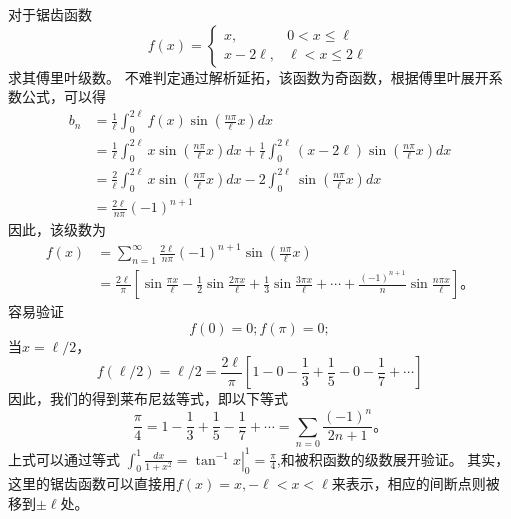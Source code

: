 \begin{examplebox}{
对于锯齿函数
\[  
f(x)= \begin{cases}
  x,   &  0 < x \leq  \ell 
  \\
  x - 2 \ell,   & \ell < x \leq 2\ell
\end{cases}
\]
求其傅里叶级数。
}
不难判定通过解析延拓，该函数为奇函数，根据傅里叶展开系数公式，可以得
\begin{align}
b_n &=   \frac{1}{\ell} \int_{0}^{2\ell} f(x) \sin {  \left( \frac{n\pi}{\ell} x \right) } dx \nonumber
\\
&= \frac{1}{\ell} \int_{0}^{2\ell} x  \sin {  \left( \frac{n\pi}{\ell} x \right) } dx \nonumber
  +
 \frac{1}{\ell} \int_{0}^{2\ell} (x - 2\ell) \sin {  \left( \frac{n\pi}{\ell} x \right) } dx \nonumber
 \\ 
 &= \frac{2}{\ell} \int_{0}^{2\ell} x \sin {  \left( \frac{n\pi}{\ell} x \right) } dx \nonumber
 -2 \int_{0}^{2\ell}   \sin {  \left( \frac{n\pi}{\ell} x \right) } dx \nonumber
 \\
 & = \frac{2\ell}{n\pi} (-1)^{n+1}  \nonumber
\end{align}
因此，该级数为
\begin{align}
f(x) &=  \sum_{n=1}^{\infty} \frac{2 \ell }{n\pi} (-1)^{n+1} \sin {  \left( \frac{n\pi}{\ell} x \right) }  \nonumber
\\
 & =\frac{2\ell}{\pi} \left[ \sin{\frac{\pi x}{\ell} } - \frac{1}{2}\sin{\frac{2\pi x}{\ell} } 
  +  \frac{1}{3}\sin{\frac{3\pi x}{\ell} } + \cdots + \frac{(-1)^{n+1}}{n}\sin{\frac{n\pi x}{\ell} }
 \right] \nonumber
\textrm{。}
\end{align}
容易验证
\[
  f(0) = 0; f(\pi) = 0;
\]
当$x=\ell/2$， 
\[
f(\ell/2) = \ell/2 =   \frac{2\ell}{\pi} \left[ 1 - 0 - \frac{1}{3} + \frac{1}{5} - 0 -\frac{1}{7}+ \cdots \right]
\]
因此，我们的得到莱布尼兹等式，即以下等式
\[
\frac{\pi}{4} = 1-\frac{1}{3} + \frac{1}{5} - \frac{1}{7} + \cdots = \sum_{n=0} \frac{(-1)^n}{2n + 1} \textrm{。}
\]
上式可以通过等式
$\int_0^1 \frac{d x}{1+x^2}=\left.\tan ^{-1} x\right|_0 ^1=\frac{\pi}{4}$,和被积函数的级数展开验证。
其实，这里的锯齿函数可以直接用$f(x) = x, -\ell < x < \ell$来表示，相应的间断点则被移到$\pm \ell$处。
\end{examplebox}


